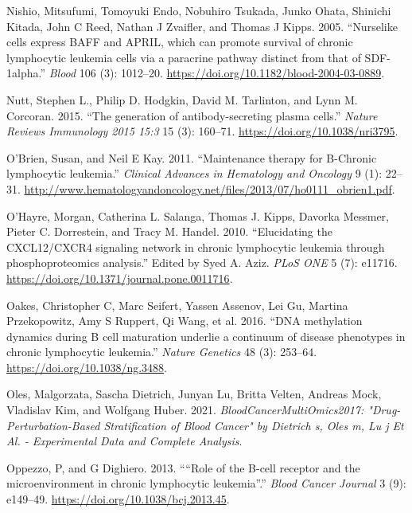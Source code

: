 \documentclass[11pt, a4paper, twosided]{book}
\newenvironment{CSLReferences}%
  {}%
  {\par}
\begin{document}
\begin{CSLReferences}{1}{0}
\leavevmode{}%
Nishio, Mitsufumi, Tomoyuki Endo, Nobuhiro Tsukada, Junko Ohata, Shinichi Kitada, John C Reed, Nathan J Zvaifler, and Thomas J Kipps. 2005. {``{Nurselike cells express BAFF and APRIL, which can promote survival of chronic lymphocytic leukemia cells via a paracrine pathway distinct from that of SDF-1alpha.}''} \emph{Blood} 106 (3): 1012--20. \url{https://doi.org/10.1182/blood-2004-03-0889}.

\leavevmode{}%
Nutt, Stephen L., Philip D. Hodgkin, David M. Tarlinton, and Lynn M. Corcoran. 2015. {``{The generation of antibody-secreting plasma cells}.''} \emph{Nature Reviews Immunology 2015 15:3} 15 (3): 160--71. \url{https://doi.org/10.1038/nri3795}.

\leavevmode{}%
O'Brien, Susan, and Neil E Kay. 2011. {``{Maintenance therapy for B-Chronic lymphocytic leukemia}.''} \emph{Clinical Advances in Hematology and Oncology} 9 (1): 22--31. \url{http://www.hematologyandoncology.net/files/2013/07/ho0111_obrien1.pdf}.

\leavevmode{}%
O'Hayre, Morgan, Catherina L. Salanga, Thomas J. Kipps, Davorka Messmer, Pieter C. Dorrestein, and Tracy M. Handel. 2010. {``{Elucidating the CXCL12/CXCR4 signaling network in chronic lymphocytic leukemia through phosphoproteomics analysis}.''} Edited by Syed A. Aziz. \emph{PLoS ONE} 5 (7): e11716. \url{https://doi.org/10.1371/journal.pone.0011716}.

\leavevmode{}%
Oakes, Christopher C, Marc Seifert, Yassen Assenov, Lei Gu, Martina Przekopowitz, Amy S Ruppert, Qi Wang, et al. 2016. {``{DNA methylation dynamics during B cell maturation underlie a continuum of disease phenotypes in chronic lymphocytic leukemia}.''} \emph{Nature Genetics} 48 (3): 253--64. \url{https://doi.org/10.1038/ng.3488}.

\leavevmode{}%
Oles, Malgorzata, Sascha Dietrich, Junyan Lu, Britta Velten, Andreas Mock, Vladislav Kim, and Wolfgang Huber. 2021. \emph{BloodCancerMultiOmics2017: "Drug-Perturbation-Based Stratification of Blood Cancer" by Dietrich s, Oles m, Lu j Et Al. - Experimental Data and Complete Analysis}.

\leavevmode{}%
Oppezzo, P, and G Dighiero. 2013. {``{``Role of the B-cell receptor and the microenvironment in chronic lymphocytic leukemia''}.''} \emph{Blood Cancer Journal} 3 (9): e149--49. \url{https://doi.org/10.1038/bcj.2013.45}.


\end{CSLReferences}
\end{document}
